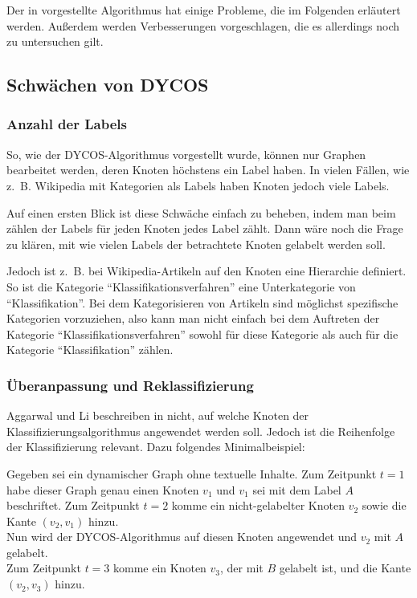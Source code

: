 Der in \cite{aggarwal2011} vorgestellte Algorithmus hat einige Probleme,
die im Folgenden erläutert werden. Außerdem werden Verbesserungen
vorgeschlagen, die es allerdings noch zu untersuchen gilt.

\subsection{Schwächen von DYCOS}
\subsubsection{Anzahl der Labels}
So, wie der DYCOS-Algorithmus vorgestellt wurde, können nur Graphen bearbeitet werden, 
deren Knoten höchstens ein Label haben. In vielen Fällen, wie z.~B. 
Wikipedia mit Kategorien als Labels haben Knoten jedoch viele Labels.

Auf einen ersten Blick ist diese Schwäche einfach zu beheben, indem 
man beim zählen der Labels für jeden Knoten jedes Label zählt. Dann
wäre noch die Frage zu klären, mit wie vielen Labels der betrachtete
Knoten gelabelt werden soll.

Jedoch ist z.~B. bei Wikipedia-Artikeln auf den Knoten eine 
Hierarchie definiert. So ist die Kategorie \enquote{Klassifikationsverfahren}
eine Unterkategorie von \enquote{Klassifikation}. Bei dem Kategorisieren
von Artikeln sind möglichst spezifische Kategorien vorzuziehen, also
kann man nicht einfach bei dem Auftreten der Kategorie \enquote{Klassifikationsverfahren}
sowohl für diese Kategorie als auch für die Kategorie \enquote{Klassifikation}
zählen.


\subsubsection{Überanpassung und Reklassifizierung}
Aggarwal und Li beschreiben in \cite{aggarwal2011} nicht, auf welche
Knoten der Klassifizierungsalgorithmus angewendet werden soll. Jedoch
ist die Reihenfolge der Klassifizierung relevant. Dazu folgendes 
Minimalbeispiel:

Gegeben sei ein dynamischer Graph ohne textuelle Inhalte. Zum Zeitpunkt
$t=1$ habe dieser Graph genau einen Knoten $v_1$ und $v_1$  sei
mit dem Label $A$ beschriftet. Zum Zeitpunkt $t=2$ komme ein nicht-gelabelter
Knoten $v_2$ sowie die Kante $(v_2, v_1)$ hinzu.\\
Nun wird der DYCOS-Algorithmus auf diesen Knoten angewendet und
$v_2$ mit $A$ gelabelt.\\
Zum Zeitpunkt $t=3$ komme ein Knoten $v_3$, der mit $B$ gelabelt ist,
und die Kante $(v_2, v_3)$ hinzu.

